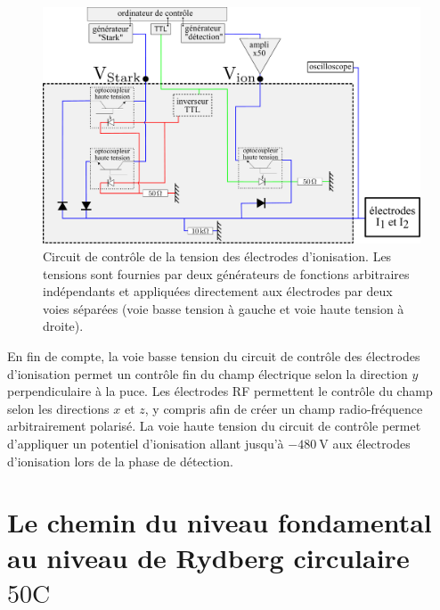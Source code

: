%
\begin{figure}
\centering
\includegraphics[width=\linewidth]{figures/circulars/detectionbox_CdF}
\caption[Nouveau circuit de contrôle de la tension des électrodes d'ionisation]{
Circuit de contrôle de la tension des électrodes d'ionisation.
Les tensions sont fournies par deux générateurs de fonctions arbitraires indépendants et appliquées directement aux électrodes par deux voies séparées (voie basse tension à gauche et voie haute tension à droite).
}
\label{fig:detectionbox_CdF}
\end{figure}

En fin de compte, la voie basse tension du circuit de contrôle des électrodes d'ionisation permet un contrôle fin du champ électrique selon la direction $y$ perpendiculaire à la puce.
Les électrodes RF permettent le contrôle du champ selon les directions $x$ et $z$, y compris afin de créer un champ radio-fréquence arbitrairement polarisé.
La voie haute tension du circuit de contrôle permet d'appliquer un potentiel d'ionisation allant jusqu'à $\SI{-480}{\V}$ aux électrodes d'ionisation lors de la phase de détection.


\clearpage
\section{Le chemin du niveau fondamental au niveau de Rydberg circulaire $\mathrm{50C}$}\label{sec:groundtocirc}
%

